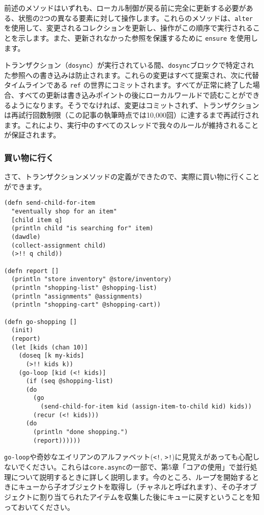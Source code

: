 前述のメソッドはいずれも、ローカル制御が戻る前に完全に更新する必要がある、状態の2つの異なる要素に対して操作します。これらのメソッドは、\texttt{alter} を使用して、変更されるコレクションを更新し、操作がこの順序で実行されることを示します。また、更新されなかった参照を保護するために \texttt{ensure} を使用します。

トランザクション（\texttt{dosync}）が実行されている間、\texttt{dosync}ブロックで特定された参照への書き込みは防止されます。これらの変更はすべて提案され、次に代替タイムラインである \texttt{ref} の世界にコミットされます。すべてが正常に終了した場合、すべての更新は書き込みポイントの後にローカルワールドで読むことができるようになります。そうでなければ、変更はコミットされず、トランザクションは再試行回数制限（この記事の執筆時点では10,000回）に達するまで再試行されます。これにより、実行中のすべてのスレッドで我々のルールが維持されることが保証されます。


\subsubsection{買い物に行く}

さて、トランザクションメソッドの定義ができたので、実際に買い物に行くことができます。


\begin{lstlisting}[numbers=none]
(defn send-child-for-item
  "eventually shop for an item"
  [child item q]
  (println child "is searching for" item)
  (dawdle)
  (collect-assignment child)
  (>!! q child))

(defn report []
  (println "store inventory" @store/inventory)
  (println "shopping-list" @shopping-list)
  (println "assignments" @assignments)
  (println "shopping-cart" @shopping-cart))

(defn go-shopping []
  (init)
  (report)
  (let [kids (chan 10)]
    (doseq [k my-kids]
      (>!! kids k))
    (go-loop [kid (<! kids)]
      (if (seq @shopping-list)
      (do
        (go
          (send-child-for-item kid (assign-item-to-child kid) kids))
        (recur (<! kids)))
      (do
        (println "done shopping.")
        (report))))))
\end{lstlisting}

\texttt{go-loop}や奇妙なエイリアンのアルファベット(\texttt{<!}, \texttt{>!})に見覚えがあっても心配しないでください。これらは\texttt{core.async}の一部で、第5章「コアの使用」で並行処理について説明するときに詳しく説明します。今のところ、ループを開始するときにキューから子オブジェクトを取得し（チャネルと呼ばれます）、その子オブジェクトに割り当てられたアイテムを収集した後にキューに戻すということを知っておいてください。

